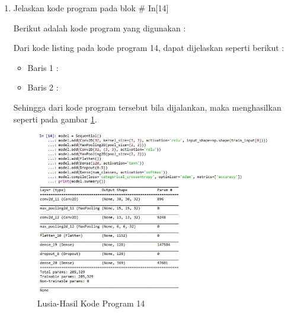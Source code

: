 \begin{enumerate}
\item Jelaskan kode program pada blok \# In[14]
	\par Berikut adalah kode program yang digunakan :
	
	\par Dari kode listing pada kode program 14, dapat dijelaskan seperti berikut :
	\begin{itemize}
	\item Baris 1	: 
	\item Baris 2	: 
	\end{itemize}
	\par Sehingga dari kode program tersebut bila dijalankan, maka menghasilkan seperti pada gambar \ref{7B14}.
		\begin{figure}[!hbtp]
		\centering
		\includegraphics[scale=0.5]{figures/w14.jpg}
		\caption{Lusia-Hasil Kode Program 14}
		\label{7B14}
		\end{figure}


\end{enumerate}
